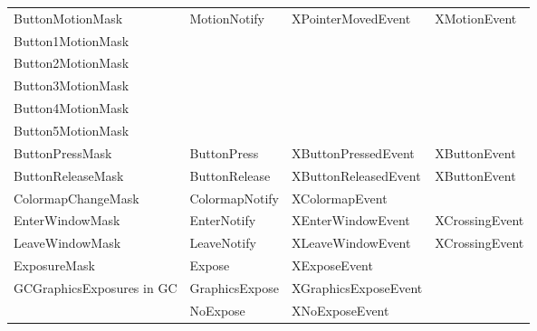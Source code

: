 \documentclass{report}
\begin{document}
\begin{itemize}
\begin{center}
\begin{tabularx}{\textwidth}{@{}XlXl@{}}
                    \midrule
                    ButtonMotionMask &MotionNotify &XPointerMovedEvent &XMotionEvent \\[2ex]
                    Button1MotionMask & & & \\[2ex]
                    Button2MotionMask & & &\\[2ex]
                    Button3MotionMask & & &\\[2ex]
                    Button4MotionMask & & &\\[2ex]
                    Button5MotionMask & & &\\[2ex]
                    ButtonPressMask &ButtonPress &XButtonPressedEvent &XButtonEvent\\[2ex]
                    ButtonReleaseMask &ButtonRelease &XButtonReleasedEvent &XButtonEvent\\[2ex]
                    ColormapChangeMask &ColormapNotify &XColormapEvent &\\[2ex]
                    EnterWindowMask &EnterNotify &XEnterWindowEvent &XCrossingEvent\\[2ex]
                    LeaveWindowMask &LeaveNotify &XLeaveWindowEvent &XCrossingEvent\\[2ex]
                    ExposureMask &Expose &XExposeEvent & \\[2ex]
                    GCGraphicsExposures in GC & GraphicsExpose & XGraphicsExposeEvent & \\[2ex]
                                              & NoExpose &XNoExposeEvent & \\
                    \bottomrule
                \end{tabularx}
            \end{center}


\end{itemize}
\end{document}
